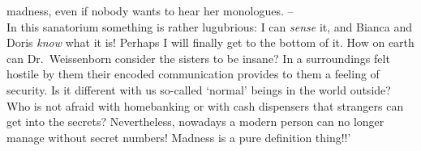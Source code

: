 madness, even if nobody wants to hear her monologues. -- \\ 
In this sanatorium something is rather lugubrious: I can {\em sense\/} it, and Bianca and Doris {\em know\/} 
what it is! 
Perhaps I will finally get to the bottom of it. 
How on earth can Dr.~Weissenborn consider the sisters to be  insane? 
In a surroundings felt hostile by them their encoded communication provides to them a feeling of security. 
Is it different with us so-called `normal' beings in the world outside?
Who is not afraid with homebanking or with cash dispensers that strangers can get into the secrets? 
Nevertheless, nowadays a modern person can no longer manage without secret numbers! 
Madness is a pure definition thing!!'


